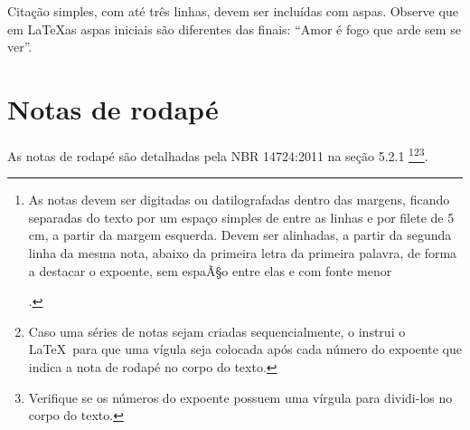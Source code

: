 Citação simples, com até três linhas, devem ser
incluídas com aspas. Observe que em \LaTeX  as aspas iniciais são diferentes das finais: ``Amor é fogo que arde sem se ver''.


\section{Notas de rodapé}


As notas de rodapé são detalhadas pela NBR 14724:2011 na seção 5.2.1
\footnote{As notas devem ser digitadas ou datilografadas dentro das margens, ficando
	separadas do texto por um espaço simples de entre as linhas e por filete de 5
	cm, a partir da margem esquerda. Devem ser alinhadas, a partir da segunda linha
	da mesma nota, abaixo da primeira letra da primeira palavra, de forma a destacar
	o expoente, sem espaÃ§o entre elas e com fonte menor
	
	.}\footnote{Caso uma séries de notas sejam
	criadas sequencialmente, o \abnTeX  instrui o \LaTeX\ para que uma vígula seja
	colocada após cada número do expoente que indica a nota de rodapé no corpo do
	texto.}\footnote{Verifique se os números do expoente possuem uma vírgula para
	dividi-los no corpo do texto.}.